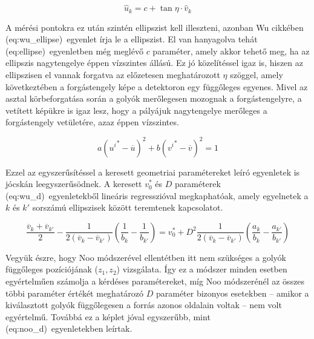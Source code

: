 \documentclass[a4paper,12pt,twoside]{article}
\begin{document}
\begin{equation}
 \label{eq:wu_eta}
\hat{u}_k  = c + \tan \eta \cdot \hat{v}_k
\end{equation}

A mérési pontokra ez után szintén ellipszist kell illeszteni, azonban Wu cikkében \aref({eq:wu_ellipse})~egyenlet írja le a ellipszist. El van hanyagolva tehát \aref({eq:ellipse})~egyenletben még meglévő $c$ paraméter, amely akkor tehető meg, ha az ellipszis nagytengelye éppen vízszintes állású. Ez jó közelítéssel igaz is, hiszen az ellipszisen el vannak forgatva az előzetesen meghatározott $\eta$ szöggel, amely következtében a forgástengely képe a detektoron egy függőleges egyenes. Mivel az asztal körbeforgatása során a golyók merőlegesen mozognak a forgástengelyre, a vetített képükre is igaz lesz, hogy a pályájuk nagytengelye merőleges a forgástengely vetületére, azaz éppen vízszintes. 

\begin{equation}
\label{eq:wu_ellipse}
a \left ( {u^i}^* - \overline{u} \right )^2 + b  \left ( {v^i}^* - \overline{v} \right )^2  = 1
\end{equation}



Ezzel az egyszerűsítéssel a keresett geometriai paramétereket leíró egyenletek is jócskán leegyszerűsödnek. A keresett $v_0^*$ és $D$ paraméterek  \aref({eq:wu_d})~egyenletekből lineáris regresszióval megkaphatóak, amely egyelnetek a $k$ és $k'$ sorszámú ellipszisek között teremtenek kapcsolatot.

\begin{equation}
\label{eq:wu_d}
\frac{\overline{v}_k + \overline{v}_{k'}}{2}  - \frac{1}{2 \left( \overline{v}_k   - \overline{v}_{k'}  \right)} \left( \frac{1}{b_k} - \frac{1}{b_{k'}} \right) = v_0^* + D^2 \frac{1}{2 \left( \overline{v}_k   - \overline{v}_{k'} \right) }   \left( \frac{a_k}{b_k} - \frac{a_{k'}}{b_{k'}} \right)
\end{equation}

Vegyük észre, hogy Noo módszerével ellentétben itt nem szükséges a golyók függőleges pozíciójának ($z_1, z_2$) vizsgálata. Így ez a módszer minden esetben egyértelműen számolja a kérdéses paramétereket, míg Noo módszerénél az összes többi paraméter értékét meghatározó $D$ paraméter bizonyos esetekben -- amikor a kiválasztott golyók függőlegesen a forrás azonos oldalain voltak -- nem volt egyértelmű. Továbbá ez a képlet jóval egyszerűbb, mint \aref({eq:noo_d})~egyenletekben leírtak.
\end{document}
